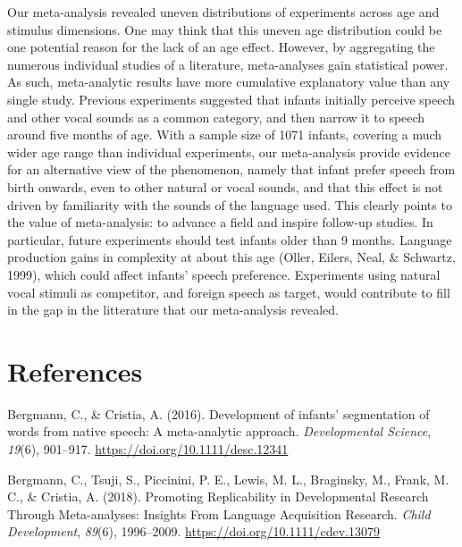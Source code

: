 \documentclass[man]{apa6}
\begin{document}
Our meta-analysis revealed uneven distributions of experiments across age and stimulus dimensions. One may think that this uneven age distribution could be one potential reason for the lack of an age effect. However, by aggregating the numerous individual studies of a literature, meta-analyses gain statistical power. As such, meta-analytic results have more cumulative explanatory value than any single study. Previous experiments suggested that infants initially perceive speech and other vocal sounds as a common category, and then narrow it to speech around five months of age. With a sample size of 1071 infants, covering a much wider age range than individual experiments, our meta-analysis provide evidence for an alternative view of the phenomenon, namely that infant prefer speech from birth onwards, even to other natural or vocal sounds, and that this effect is not driven by familiarity with the sounds of the language used. This clearly points to the value of meta-analysis: to advance a field and inspire follow-up studies. In particular, future experiments should test infants older than 9 months. Language production gains in complexity at about this age (Oller, Eilers, Neal, \& Schwartz, 1999), which could affect infants' speech preference. Experiments using natural vocal stimuli as competitor, and foreign speech as target, would contribute to fill in the gap in the litterature that our meta-analysis revealed.

\newpage

\hypertarget{references}{%
\section{References}\label{references}}

\begingroup
\setlength{\parindent}{-0.5in}
\setlength{\leftskip}{0.5in}

\hypertarget{refs}{}
\leavevmode\hypertarget{ref-bergmann_development_2016}{}%
Bergmann, C., \& Cristia, A. (2016). Development of infants' segmentation of words from native speech: A meta-analytic approach. \emph{Developmental Science}, \emph{19}(6), 901--917. \url{https://doi.org/10.1111/desc.12341}

\leavevmode\hypertarget{ref-bergmann_promoting_2018}{}%
Bergmann, C., Tsuji, S., Piccinini, P. E., Lewis, M. L., Braginsky, M., Frank, M. C., \& Cristia, A. (2018). Promoting Replicability in Developmental Research Through Meta-analyses: Insights From Language Acquisition Research. \emph{Child Development}, \emph{89}(6), 1996--2009. \url{https://doi.org/10.1111/cdev.13079}
\end{document}
